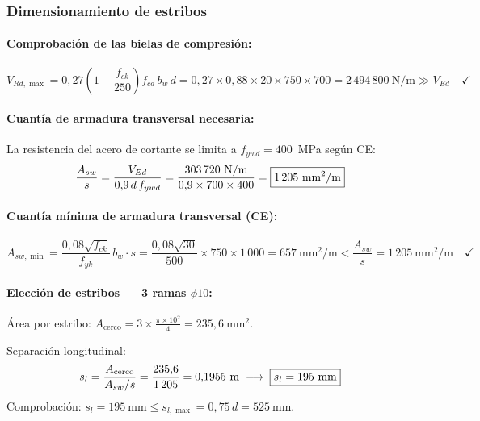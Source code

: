 \subsubsection{Dimensionamiento de estribos}

\paragraph{Comprobación de las bielas de compresión:}
\begin{equation}
  V_{Rd,\max} = 0{,}27\!\left(1-\frac{f_{ck}}{250}\right)f_{cd}\,b_w\,d
    = 0{,}27\times 0{,}88\times 20\times 750\times 700
    = 2\,494\,800~\text{N/m} \gg V_{Ed} \quad\checkmark
\end{equation}

\paragraph{Cuantía de armadura transversal necesaria:}

La resistencia del acero de cortante se limita a $f_{ywd} = 400$~MPa según CE:
\begin{equation}
  \frac{A_{sw}}{s} = \frac{V_{Ed}}{0{,}9\,d\,f_{ywd}}
    = \frac{303\,720~\text{N/m}}{0{,}9\times 700\times 400}
    = \boxed{1\,205~\text{mm}^2/\text{m}}
  \label{eq:Asw_s}
\end{equation}

\paragraph{Cuantía mínima de armadura transversal (CE):}
\[
  A_{sw,\min} = \frac{0{,}08\sqrt{f_{ck}}}{f_{yk}}\,b_w \cdot s
  = \frac{0{,}08\sqrt{30}}{500}\times 750 \times 1\,000
  = 657~\text{mm}^2/\text{m}
  < \frac{A_{sw}}{s} = 1\,205~\text{mm}^2/\text{m} \quad\checkmark
\]

\paragraph{Elección de estribos — 3 ramas $\phi 10$:}

Área por estribo: $A_{\mathrm{cerco}} = 3\times\frac{\pi\times 10^2}{4}
= 235{,}6~\text{mm}^2$.

Separación longitudinal:
\[
  s_l = \frac{A_{\mathrm{cerco}}}{A_{sw}/s}
      = \frac{235{,}6}{1\,205} = 0{,}1955~\text{m}
  \;\longrightarrow\; \boxed{s_l = 195~\text{mm}}
\]
Comprobación: $s_l = 195~\text{mm} \leq s_{l,\max} = 0{,}75\,d = 525~\text{mm}$\checkmark.

